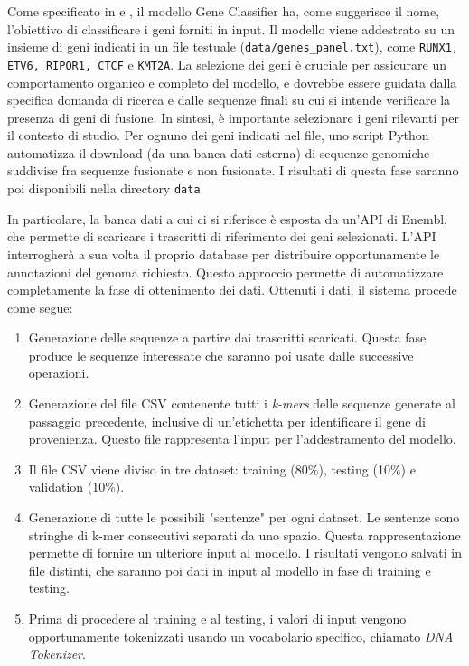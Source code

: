 Come specificato in \cite{cirillo} e \cite{desimone}, il modello Gene Classifier ha, come suggerisce il nome, l'obiettivo di classificare i geni forniti in input. Il modello viene addestrato su un insieme di geni  indicati in un file testuale ({\small \verb|data/genes_panel.txt|}), come {\small \verb|RUNX1, ETV6, RIPOR1, CTCF|} e {\small \verb|KMT2A|}. La selezione dei geni è cruciale per assicurare un comportamento organico e completo del modello, e dovrebbe essere guidata dalla specifica domanda di ricerca e dalle sequenze finali su cui si intende verificare la presenza di geni di fusione. In sintesi, è importante selezionare i geni rilevanti per il contesto di studio. Per ognuno dei geni indicati nel file, uno script Python automatizza il download (da una banca dati esterna) di sequenze genomiche suddivise fra sequenze fusionate e non fusionate. I risultati di questa fase saranno poi disponibili nella directory {\small \verb|data|}.

In particolare, la banca dati a cui ci si riferisce è esposta da un'API di Enembl, che permette di scaricare i trascritti di riferimento dei geni selezionati. L'API interrogherà a sua volta il proprio database per distribuire opportunamente le annotazioni del genoma richiesto. Questo approccio permette di automatizzare completamente la fase di ottenimento dei dati. Ottenuti i dati, il sistema procede come segue:

\begin{enumerate}
    \item Generazione delle sequenze a partire dai trascritti scaricati. Questa fase produce le sequenze interessate che saranno poi usate dalle successive operazioni.
    \item Generazione del file CSV contenente tutti i {\em k-mers} delle sequenze generate al passaggio precedente, inclusive di un'etichetta per identificare il gene di provenienza. Questo file rappresenta l'input per l'addestramento del modello.
    \item Il file CSV viene diviso in tre dataset: training (80\%), testing (10\%) e validation (10\%).
    \item Generazione di tutte le possibili "sentenze" per ogni dataset. Le sentenze sono stringhe di k-mer consecutivi separati da uno spazio. Questa rappresentazione permette di fornire un ulteriore input al modello. I risultati vengono salvati in file distinti, che saranno poi dati in input al modello in fase di training e testing.
    \item Prima di procedere al training e al testing, i valori di input vengono opportunamente tokenizzati usando un vocabolario specifico, chiamato {\em DNA Tokenizer}.
\end{enumerate}

